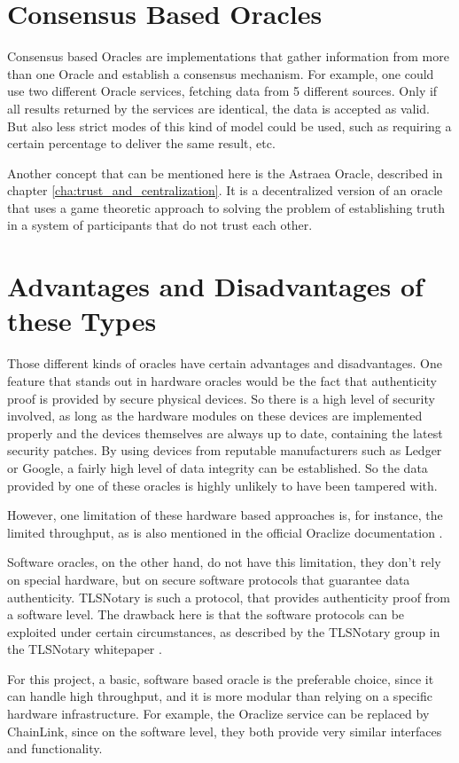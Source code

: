 \section{Consensus Based Oracles}
Consensus based Oracles are implementations that gather information from more than one Oracle and establish a consensus mechanism. For example, one could use two different Oracle services, fetching data from 5 different sources. Only if all results returned by the services are identical, the data is accepted as valid. But also less strict modes of this kind of model could be used, such as requiring a certain percentage to deliver the same result, etc.

Another concept that can be mentioned here is the Astraea Oracle, described in chapter \ref{cha:trust_and_centralization}. It is a decentralized version of an oracle that uses a game theoretic approach to solving the problem of establishing truth in a system of  participants that do not trust each other.

\section{Advantages and Disadvantages of these Types}
Those different kinds of oracles have certain advantages and disadvantages. One feature that stands out in hardware oracles would be the fact that authenticity proof is provided by secure physical devices. So there is a high level of security involved, as long as the hardware modules on these devices are implemented properly and the devices themselves are always up to date, containing the latest security patches. By using devices from reputable manufacturers such as Ledger or Google, a fairly high level of data integrity can be established. So the data provided by one of these oracles is highly unlikely to have been tampered with.

However, one limitation of these hardware based approaches is, for instance, the limited throughput, as is also mentioned in the official Oraclize documentation \cite{oraclizedoc}. 

Software oracles, on the other hand, do not have this limitation, they don't rely on special hardware, but on secure software protocols that guarantee data authenticity. TLSNotary is such a protocol, that provides authenticity proof from a software level. The drawback here is that the software protocols can be exploited under certain circumstances, as described by the TLSNotary group in the TLSNotary whitepaper \cite{tlsnotarywhitepaper}.

For this project, a basic, software based oracle is the preferable choice, since it can handle high throughput, and it is more modular than relying on a specific hardware infrastructure. For example, the Oraclize service can be replaced by ChainLink, since on the software level, they both provide very similar interfaces and functionality.
